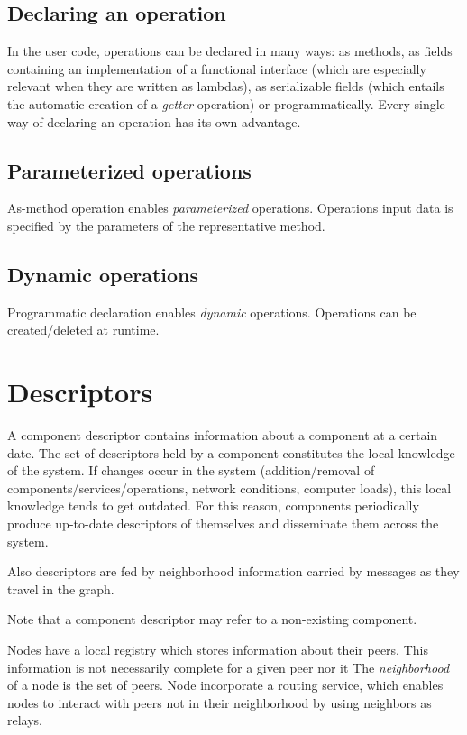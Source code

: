 \documentclass{article}
\begin{document}
\subsection{Declaring an operation}
In the user code, operations can be declared in many ways: as methods, as fields containing an implementation of a functional interface (which are especially relevant when they are written as lambdas), as serializable fields (which entails the automatic creation of a {\em getter} operation) or programmatically. Every single way of declaring an operation has its own advantage.

\subsection{Parameterized operations}
 As-method operation enables {\em parameterized} operations. Operations input data is specified by the parameters of the representative method.
 
\subsection{Dynamic operations}
Programmatic declaration enables {\em dynamic} operations. Operations can be created/deleted at runtime.

\section{Descriptors}
A component descriptor contains information  about a component at a certain date. The set of descriptors held by a component constitutes the local knowledge of the system.
If changes occur in the system (addition/removal of components/services/operations, network conditions, computer loads), this local knowledge tends to get outdated. For this reason, components periodically produce up-to-date descriptors of themselves and disseminate them across the system.

Also descriptors are fed by neighborhood information carried by messages as they travel in the graph.

Note that a component descriptor may refer to a non-existing component.


Nodes have a local registry which stores information about their peers. This information is not necessarily complete for a given peer nor it  The \textit{neighborhood} of a node is the set of peers. Node incorporate a routing service, which enables nodes to interact with peers not in their neighborhood by 
using neighbors as relays.
\end{document}
